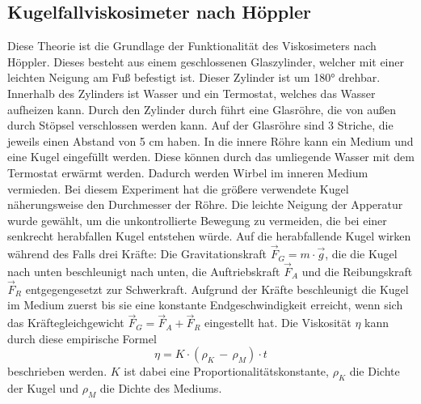 \subsection{Kugelfallviskosimeter nach Höppler}
Diese Theorie ist die Grundlage der Funktionalität des Viskosimeters 
nach Höppler. Dieses besteht aus einem geschlossenen Glaszylinder, 
welcher mit einer leichten Neigung am Fuß befestigt
ist. Dieser Zylinder ist um 180° drehbar. 
Innerhalb des Zylinders ist Wasser und ein Termostat, welches das Wasser aufheizen 
kann.
Durch den Zylinder durch führt eine Glasröhre, die von außen durch Stöpsel 
verschlossen werden kann. Auf der Glasröhre sind 3 Striche, die jeweils 
einen Abstand von 5 \unit{\centi\meter} haben. In die innere Röhre kann
ein Medium und eine Kugel eingefüllt werden. Diese können durch das umliegende Wasser mit dem 
Termostat erwärmt werden. Dadurch werden Wirbel im inneren Medium vermieden. 
Bei diesem Experiment hat die größere verwendete Kugel näherungsweise den Durchmesser der Röhre. 
Die leichte Neigung der Apperatur wurde gewählt, um die unkontrollierte Bewegung zu vermeiden, 
die bei einer senkrecht herabfallen Kugel entstehen würde. Auf die herabfallende Kugel
wirken während des Falls drei Kräfte: Die Gravitationskraft $\vec{F}_{G} = m \cdot \vec{g}$, 
die die Kugel nach unten beschleunigt nach unten, die Auftriebskraft $\vec{F}_{A}$ und die 
Reibungskraft $\vec{F}_{R}$ entgegengesetzt zur Schwerkraft. Aufgrund der Kräfte beschleunigt
die Kugel im Medium zuerst bis sie eine konstante Endgeschwindigkeit erreicht, wenn sich das Kräftegleichgewicht 
$\vec{F}_{G} = \vec{F}_{A} + \vec{F}_{R}$ eingestellt hat.
Die Viskosität $\eta$ kann durch diese empirische Formel  
\begin{equation}
    \eta = K \cdot \left( \rho_{K}\,-\,\rho_{M} \right) \cdot t
    \label{equ:EmpirischeEtaFunktion}
\end{equation} 
beschrieben werden. $K$ ist dabei eine Proportionalitätskonstante, $\rho_{K}$ die Dichte der Kugel und $\rho_{M}$
die Dichte des Mediums.
%
%
%
